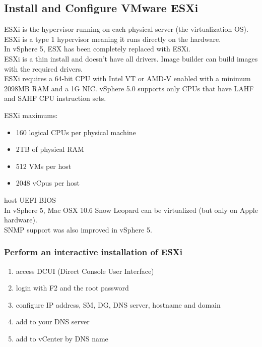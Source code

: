 \subsection{Install and Configure VMware ESXi}

ESXi is the hypervisor running on each physical server (the virtualization
OS). ESXi is a type 1 hypervisor meaning it runs directly on the hardware.\\

In vSphere 5, ESX has been completely replaced with ESXi.\\

ESXi is a thin install and doesn't have all drivers. Image builder can build
images with the required drivers.\\

ESXi requires a 64-bit CPU with Intel VT or AMD-V enabled with a minimum 2098MB RAM and a
1G NIC. vSphere 5.0 supports only CPUs that have LAHF and SAHF CPU instruction sets.

ESXi maximums:

\begin{itemize}

\item 160 logical CPUs per physical machine
\item 2TB of physical RAM
\item 512 VMs per host
\item 2048 vCpus per host

\end{itemize}

host UEFI BIOS\\

In vSphere 5, Mac OSX 10.6 Snow Leopard can be virtualized (but only on Apple
hardware).\\

SNMP support was also improved in vSphere 5.

\subsubsection{Perform an interactive installation of ESXi}

\begin{enumerate}
\item access DCUI (Direct Console User Interface)
\item login with F2 and the root password
\item configure IP address, SM, DG, DNS server, hostname and domain
\item add to your DNS server
\item add to vCenter by DNS name
\end{enumerate}

